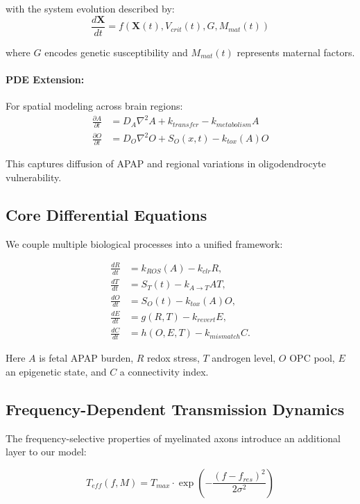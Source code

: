 \documentclass[11pt]{article}
\let\oldsubsection\subsection
\renewcommand{\subsection}[1]{\oldsubsection{#1}\setlength{\leftskip}{0.75em}}
\begin{document}
with the system evolution described by:
\begin{equation}
\frac{d\mathbf{X}}{dt} = f(\mathbf{X}(t), V_{crit}(t), G, M_{mat}(t))
\end{equation}

where $G$ encodes genetic susceptibility and $M_{mat}(t)$ represents maternal factors.

\paragraph{PDE Extension:}
For spatial modeling across brain regions:
\begin{align}
\frac{\partial A}{\partial t} &= D_A \nabla^2 A + k_{transfer} - k_{metabolism}A \\
\frac{\partial O}{\partial t} &= D_O \nabla^2 O + S_O(x,t) - k_{tox}(A)O
\end{align}

This captures diffusion of APAP and regional variations in oligodendrocyte vulnerability.

\subsection{Core Differential Equations}
We couple multiple biological processes into a unified framework:

\begin{align}
\frac{dR}{dt} &= k_{ROS}(A) - k_{clr}R, \\
\frac{dT}{dt} &= S_T(t) - k_{A \rightarrow T}AT, \\
\frac{dO}{dt} &= S_O(t) - k_{tox}(A)O, \\
\frac{dE}{dt} &= g(R,T) - k_{revert}E, \\
\frac{dC}{dt} &= h(O,E,T) - k_{mismatch}C.
\end{align}

Here $A$ is fetal APAP burden, $R$ redox stress, $T$ androgen level, $O$ OPC pool, $E$ an epigenetic state, and $C$ a connectivity index.

\subsection{Frequency-Dependent Transmission Dynamics}
The frequency-selective properties of myelinated axons introduce an additional layer to our model:

\begin{equation}
T_{eff}(f,M) = T_{max} \cdot \exp\left(-\frac{(f-f_{res})^2}{2\sigma^2}\right)
\end{equation}
\end{document}
